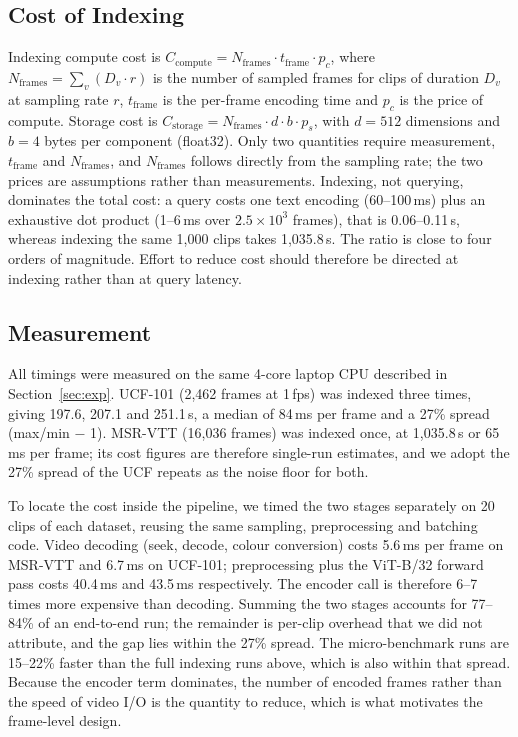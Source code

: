 \documentclass[journal]{IEEEtran}
\begin{document}
\subsection{Cost of Indexing}
Indexing compute cost is $C_{\text{compute}} = N_{\text{frames}} \cdot t_{\text{frame}} \cdot
p_c$, where $N_{\text{frames}} = \sum_v (D_v \cdot r)$ is the number of sampled frames for
clips of duration $D_v$ at sampling rate $r$, $t_{\text{frame}}$ is the per-frame encoding time
and $p_c$ is the price of compute. Storage cost is $C_{\text{storage}} = N_{\text{frames}} \cdot
d \cdot b \cdot p_s$, with $d=512$ dimensions and $b=4$ bytes per component (float32). Only two
quantities require measurement, $t_{\text{frame}}$ and $N_{\text{frames}}$, and
$N_{\text{frames}}$ follows directly from the sampling rate; the two prices are assumptions
rather than measurements. Indexing, not querying, dominates the total cost: a query costs one
text encoding (60--100\,ms) plus an exhaustive dot product (1--6\,ms over
$2.5\times10^{3}$ frames), that is 0.06--0.11\,s, whereas indexing the same 1{,}000 clips takes
1{,}035.8\,s. The ratio is close to four orders of magnitude. Effort to reduce cost should
therefore be directed at indexing rather than at query latency.

\subsection{Measurement}
All timings were measured on the same 4-core laptop CPU described in Section~\ref{sec:exp}.
UCF-101 (2{,}462 frames at 1\,fps) was indexed three times, giving 197.6, 207.1 and 251.1\,s, a
median of 84\,ms per frame and a 27\% spread (max/min $-$ 1). MSR-VTT (16{,}036 frames) was indexed once, at
1{,}035.8\,s or 65\,ms per frame; its cost figures are therefore single-run estimates, and we
adopt the 27\% spread of the UCF repeats as the noise floor for both.

To locate the cost inside the pipeline, we timed the two stages separately on 20 clips of each
dataset, reusing the same sampling, preprocessing and batching code. Video decoding (seek,
decode, colour conversion) costs 5.6\,ms per frame on MSR-VTT and 6.7\,ms on UCF-101;
preprocessing plus the ViT-B/32 forward pass costs 40.4\,ms and 43.5\,ms respectively. The
encoder call is therefore 6--7 times more expensive than decoding. Summing the two stages
accounts for 77--84\% of an end-to-end run; the remainder is per-clip overhead that we did not
attribute, and the gap lies within the 27\% spread. The micro-benchmark runs are 15--22\% faster
than the full indexing runs above, which is also within that spread. Because the encoder term
dominates, the number of encoded frames rather than the speed of video I/O is the quantity to
reduce, which is what motivates the frame-level design.
\end{document}
